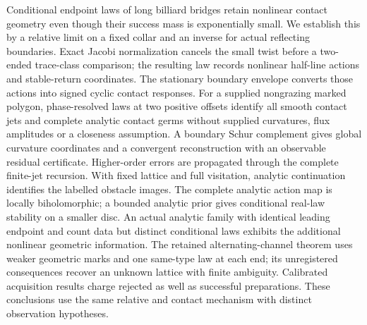 Conditional endpoint laws of long billiard bridges retain nonlinear
contact geometry even though their success mass is exponentially small.
We establish this by a relative limit on a fixed collar and an inverse
for actual reflecting boundaries.  Exact Jacobi normalization cancels
the small twist before a two-ended trace-class comparison; the resulting
law records nonlinear half-line actions and stable-return coordinates.
The stationary boundary envelope converts those actions into signed
cyclic contact responses.  For a supplied nongrazing marked polygon,
phase-resolved laws at two positive offsets identify all smooth contact
jets and complete analytic contact germs without supplied curvatures,
flux amplitudes or a closeness assumption.  A boundary Schur complement
gives global curvature coordinates and a convergent reconstruction with
an observable residual certificate.  Higher-order errors are propagated
through the complete finite-jet recursion.  With fixed lattice and full
visitation, analytic continuation identifies the labelled obstacle
images.  The complete analytic action map is locally biholomorphic;
a bounded analytic prior gives conditional real-law stability on a
smaller disc.  An actual analytic family with identical leading endpoint
and count data but distinct conditional laws exhibits the additional
nonlinear geometric information.  The retained alternating-channel
theorem uses weaker geometric marks and one same-type law at each end;
its unregistered consequences recover an unknown lattice with finite
ambiguity.  Calibrated acquisition results charge rejected as well as
successful preparations.  These conclusions use the same relative and
contact mechanism with distinct observation hypotheses.

